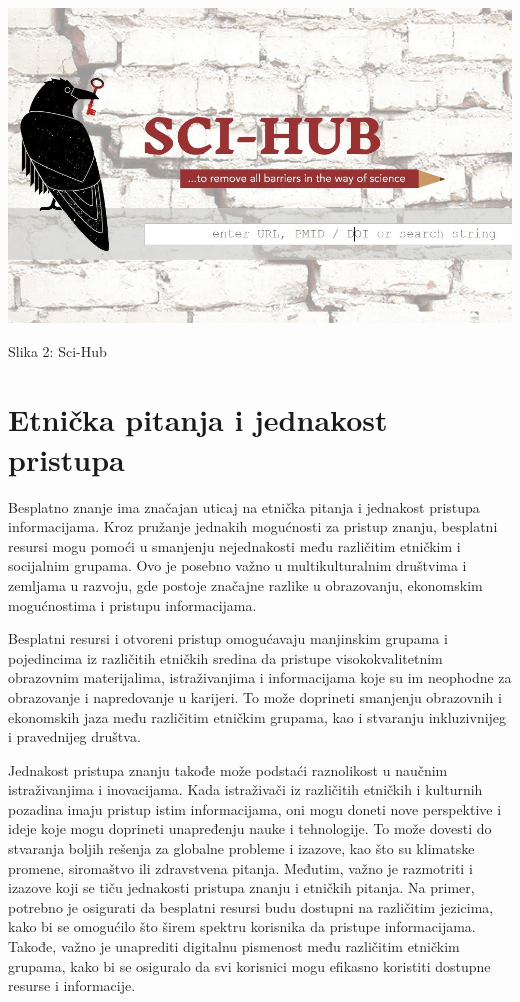 \documentclass[a4paper]{article}
\begin{document}
{\begin{center}
\includegraphics[scale=0.3]{scihub.jpg}
\end{center}
\caption{Slika 2: Sci-Hub}
\label{sci-hub}


\setlength{\parskip}{1em}


\section{Etnička pitanja i jednakost pristupa}
\label{Etnička pitanja i jednakost pristupa}


Besplatno znanje ima značajan uticaj na etnička pitanja i jednakost pristupa informacijama. Kroz pružanje jednakih mogućnosti za pristup znanju, besplatni resursi mogu pomoći u smanjenju nejednakosti među različitim etničkim i socijalnim grupama. Ovo je posebno važno u multikulturalnim društvima i zemljama u razvoju, gde postoje značajne razlike u obrazovanju, ekonomskim mogućnostima i pristupu informacijama.

Besplatni resursi i otvoreni pristup omogućavaju manjinskim grupama i pojedincima iz različitih etničkih sredina da pristupe visokokvalitetnim obrazovnim materijalima, istraživanjima i informacijama koje su im neophodne za obrazovanje i napredovanje u karijeri. To može doprineti smanjenju obrazovnih i ekonomskih jaza među različitim etničkim grupama, kao i stvaranju inkluzivnijeg i pravednijeg društva.

Jednakost pristupa znanju takođe može podstaći raznolikost u naučnim istraživanjima i inovacijama. Kada istraživači iz različitih etničkih i kulturnih pozadina imaju pristup istim informacijama, oni mogu doneti nove perspektive i ideje koje mogu doprineti unapređenju nauke i tehnologije. To može dovesti do stvaranja boljih rešenja za globalne probleme i izazove, kao što su klimatske promene, siromaštvo ili zdravstvena pitanja.
Međutim, važno je razmotriti i izazove koji se tiču jednakosti pristupa znanju i etničkih pitanja. Na primer, potrebno je osigurati da besplatni resursi budu dostupni na različitim jezicima, kako bi se omogućilo što širem spektru korisnika da pristupe informacijama. Takođe, važno je unaprediti digitalnu pismenost među različitim etničkim grupama, kako bi se osiguralo da svi korisnici mogu efikasno koristiti dostupne resurse i informacije.



}
\end{document}
